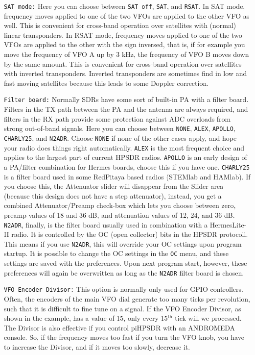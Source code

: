 \documentclass[12pt]{book}
\def\rett#1{\texttt{\color{red}#1}}
\def\bltt#1{\texttt{\color{blue}#1}}
\begin{document}
\rett{SAT mode:} Here you can choose between \texttt{SAT off}, \texttt{SAT}, and \texttt{RSAT}. In SAT mode,
frequency moves applied to one of the two VFOs are applied to the other VFO as well. This is convenient
for cross-band operation over satellites with (normal) linear transponders. In RSAT mode, frequency
moves applied to one of the two VFOs are applied to the other with the sign inversed, that is, if
for example you move the frequency of VFO A up by 3 kHz, the frequency of VFO B moves down by the same
amount. This is convenient for cross-band operation over satellites with inverted transponders. Inverted
transponders are sometimes find in low and fast moving satellites because this leads to some 
Doppler correction.

\rett{Filter board:} Normally SDRs have some sort of built-in PA with a filter board. Filters in the TX path
between the PA and the antenna are always required, and filters in the RX path provide some protection
against ADC overloads from strong out-of-band signals. Here you can choose between \texttt{NONE}, \texttt{ALEX},
\texttt{APOLLO}, \texttt{CHARLY25}, and \texttt{N2ADR}. Choose \texttt{NONE} if none of the other cases
apply, and hope your radio does things right automatically. \texttt{ALEX} is the most frequent choice
and applies to the largest part of current HPSDR radios. \texttt{APOLLO} is an early design of a
PA/filter combination for Hermes boards, choose this if you have one. \texttt{CHARLY25} is a filter board
used in some RedPitaya based radios (STEMlab and HAMlab). If you choose this, the Attenuator slider will
disappear from the Slider area (because this design does not have a step attenuator), instead, you get
a combined Attenuator/Preamp check-box which lets you choose between zero, preamp values of 18 and 36 dB,
and attenuation values of 12, 24, and 36 dB. \texttt{N2ADR}, finally, is the filter board usually used
in combination with a HermesLite-II radio. It is controlled by the OC (open collector) bits in the HPSDR
protocoll. This means if you use \texttt{N2ADR}, this will override your OC settings upon program startup.
It is possible to change the OC settings in the \bltt{OC} menu, and these settings are saved with the
preferences. Upon next program start, however, these preferences will again be overwritten as long
as the \texttt{N2ADR} filter board is chosen.

\rett{VFO Encoder Divisor:} This option is normally only used for GPIO controllers. Often, the 
encoders of the main VFO dial generate too many ticks per revolution, such that it is difficult
to fine tune on a signal. If the VFO Encoder Divisor, as shown in the example, has a value of
15, only every 15$^\textrm{th}$ tick will we processed. The Divisor is also effective if you
control piHPSDR with an ANDROMEDA console. So, if the frequency moves too fast if you turn
the VFO knob, you have to increase the Divisor, and if it moves too slowly, decrease it.
\end{document}
